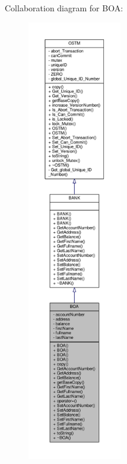 Collaboration diagram for B\+OA\+:
\nopagebreak
\begin{figure}[H]
\begin{center}
\leavevmode
\includegraphics[height=550pt]{class_b_o_a__coll__graph}
\end{center}
\end{figure}
